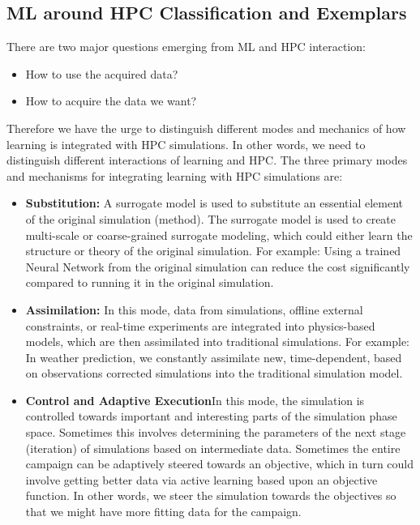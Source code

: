\documentclass[conference]{IEEEtran}
\begin{document}
\subsection{ML around HPC Classification and Exemplars}
There are two major questions emerging from ML and HPC interaction:  
\begin{itemize}
\item How to use the acquired data?
\item How to acquire the data we want?
\end{itemize}
Therefore we have the urge to distinguish different modes and mechanics of how learning is integrated with HPC simulations. In other words, we need to distinguish different interactions of learning and HPC. The three primary modes and mechanisms for integrating learning with HPC simulations are:
\begin{itemize}
\item \textbf{Substitution:} A surrogate model is used to substitute an essential element of the original simulation (method). The surrogate model is used to create multi-scale or coarse-grained surrogate modeling, which could either learn the structure or theory of the original simulation. For example: Using a trained Neural Network from the original simulation can reduce the cost significantly compared to running it in the original simulation\cite{b45}.
\item \textbf{Assimilation:} In this mode, data from simulations, offline external constraints, or real-time experiments are integrated into physics-based models, which are then assimilated into traditional simulations. For example: In weather prediction, we constantly assimilate new, time-dependent, based on observations corrected simulations into the traditional simulation model\cite{b22}.
\item \textbf{Control and Adaptive Execution}In this mode, the simulation is controlled towards important and interesting parts of the simulation phase space. Sometimes this involves determining the parameters of the next stage (iteration) of simulations based on intermediate data. Sometimes the entire campaign can be adaptively steered towards an objective, which in turn could involve getting better data via active learning based upon an objective function. In other words, we steer the simulation towards the objectives so that we might have more fitting data for the campaign.
\end{itemize}
\end{document}

